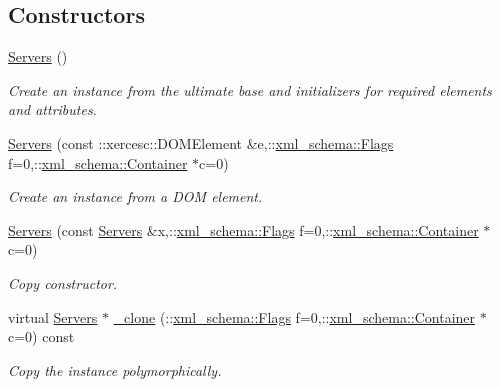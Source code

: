 \subsection*{Constructors}
\begin{DoxyCompactItemize}
\item 
\hypertarget{classopenstack_1_1xml_1_1Servers_a3db99e99caade0d753201711051d7396}{
\hyperlink{classopenstack_1_1xml_1_1Servers_a3db99e99caade0d753201711051d7396}{Servers} ()}
\label{classopenstack_1_1xml_1_1Servers_a3db99e99caade0d753201711051d7396}

\begin{DoxyCompactList}\small\item\em Create an instance from the ultimate base and initializers for required elements and attributes. \item\end{DoxyCompactList}\item 
\hyperlink{classopenstack_1_1xml_1_1Servers_a4a597d1ab88c1b47fe71b8e9aabad107}{Servers} (const ::xercesc::DOMElement \&e,::\hyperlink{namespacexml__schema_affb4c227cbd9aa7453dd1dc5a1401943}{xml\_\-schema::Flags} f=0,::\hyperlink{namespacexml__schema_a333dea2213742aea47a37532dec4ec27}{xml\_\-schema::Container} $\ast$c=0)
\begin{DoxyCompactList}\small\item\em Create an instance from a DOM element. \item\end{DoxyCompactList}\item 
\hyperlink{classopenstack_1_1xml_1_1Servers_a0116484001b88339e5fe2a1252401e67}{Servers} (const \hyperlink{classopenstack_1_1xml_1_1Servers}{Servers} \&x,::\hyperlink{namespacexml__schema_affb4c227cbd9aa7453dd1dc5a1401943}{xml\_\-schema::Flags} f=0,::\hyperlink{namespacexml__schema_a333dea2213742aea47a37532dec4ec27}{xml\_\-schema::Container} $\ast$c=0)
\begin{DoxyCompactList}\small\item\em Copy constructor. \item\end{DoxyCompactList}\item 
virtual \hyperlink{classopenstack_1_1xml_1_1Servers}{Servers} $\ast$ \hyperlink{classopenstack_1_1xml_1_1Servers_a13e4526e3ef84ac52eb90db7b325b26e}{\_\-clone} (::\hyperlink{namespacexml__schema_affb4c227cbd9aa7453dd1dc5a1401943}{xml\_\-schema::Flags} f=0,::\hyperlink{namespacexml__schema_a333dea2213742aea47a37532dec4ec27}{xml\_\-schema::Container} $\ast$c=0) const 
\begin{DoxyCompactList}\small\item\em Copy the instance polymorphically. \item\end{DoxyCompactList}\end{DoxyCompactItemize}


